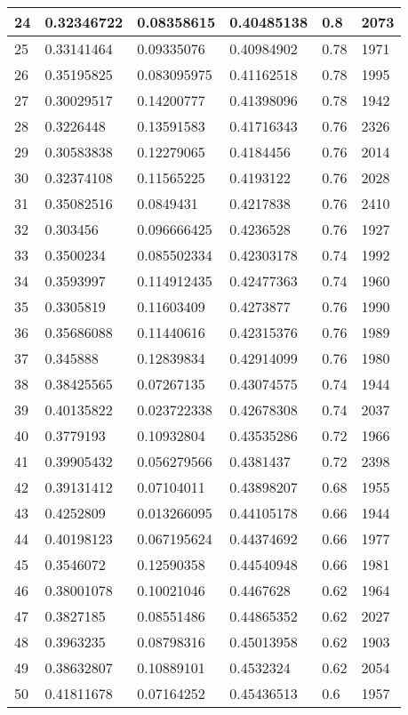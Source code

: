 \begin{longtable}{|l|l|l|l|l|l|}
24 & 0.32346722 & 0.08358615 & 0.40485138 & 0.8 & 2073 \\ \hline 
25 & 0.33141464 & 0.09335076 & 0.40984902 & 0.78 & 1971 \\ \hline 
26 & 0.35195825 & 0.083095975 & 0.41162518 & 0.78 & 1995 \\ \hline 
27 & 0.30029517 & 0.14200777 & 0.41398096 & 0.78 & 1942 \\ \hline 
28 & 0.3226448 & 0.13591583 & 0.41716343 & 0.76 & 2326 \\ \hline 
29 & 0.30583838 & 0.12279065 & 0.4184456 & 0.76 & 2014 \\ \hline 
30 & 0.32374108 & 0.11565225 & 0.4193122 & 0.76 & 2028 \\ \hline 
31 & 0.35082516 & 0.0849431 & 0.4217838 & 0.76 & 2410 \\ \hline 
32 & 0.303456 & 0.096666425 & 0.4236528 & 0.76 & 1927 \\ \hline 
33 & 0.3500234 & 0.085502334 & 0.42303178 & 0.74 & 1992 \\ \hline 
34 & 0.3593997 & 0.114912435 & 0.42477363 & 0.74 & 1960 \\ \hline 
35 & 0.3305819 & 0.11603409 & 0.4273877 & 0.76 & 1990 \\ \hline 
36 & 0.35686088 & 0.11440616 & 0.42315376 & 0.76 & 1989 \\ \hline 
37 & 0.345888 & 0.12839834 & 0.42914099 & 0.76 & 1980 \\ \hline 
38 & 0.38425565 & 0.07267135 & 0.43074575 & 0.74 & 1944 \\ \hline 
39 & 0.40135822 & 0.023722338 & 0.42678308 & 0.74 & 2037 \\ \hline 
40 & 0.3779193 & 0.10932804 & 0.43535286 & 0.72 & 1966 \\ \hline 
41 & 0.39905432 & 0.056279566 & 0.4381437 & 0.72 & 2398 \\ \hline 
42 & 0.39131412 & 0.07104011 & 0.43898207 & 0.68 & 1955 \\ \hline 
43 & 0.4252809 & 0.013266095 & 0.44105178 & 0.66 & 1944 \\ \hline 
44 & 0.40198123 & 0.067195624 & 0.44374692 & 0.66 & 1977 \\ \hline 
45 & 0.3546072 & 0.12590358 & 0.44540948 & 0.66 & 1981 \\ \hline 
46 & 0.38001078 & 0.10021046 & 0.4467628 & 0.62 & 1964 \\ \hline 
47 & 0.3827185 & 0.08551486 & 0.44865352 & 0.62 & 2027 \\ \hline 
48 & 0.3963235 & 0.08798316 & 0.45013958 & 0.62 & 1903 \\ \hline 
49 & 0.38632807 & 0.10889101 & 0.4532324 & 0.62 & 2054 \\ \hline 
50 & 0.41811678 & 0.07164252 & 0.45436513 & 0.6 & 1957 \\ \hline 
\end{longtable}